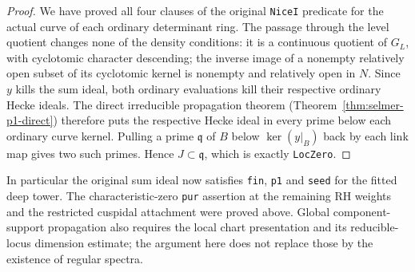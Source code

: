 \begin{proof}
We have proved all four clauses of the original
\texttt{NiceI} predicate for the actual curve of
each ordinary determinant ring. The passage
through the level quotient changes none of the
density conditions: it is a continuous quotient
of $G_L$, with cyclotomic character descending;
the inverse image of a nonempty relatively open
subset of its cyclotomic kernel is nonempty and
relatively open in $N$.
Since $y$ kills the sum ideal, both ordinary
evaluations kill their respective ordinary Hecke
ideals. The direct irreducible propagation theorem
(Theorem~\ref{thm:selmer-p1-direct}) therefore puts the respective Hecke
ideal in every prime below each ordinary curve
kernel. Pulling a prime $\mathfrak q$ of $B$
below $\ker(y|_B)$ back by each link map gives
two such primes. Hence $J\subset\mathfrak q$,
which is exactly \texttt{LocZero}.
\end{proof}

In particular the original sum ideal now satisfies
\texttt{fin}, \texttt{p1} and \texttt{seed} for
the fitted deep tower. The characteristic-zero
\texttt{pur} assertion at the remaining RH weights
and the restricted cuspidal attachment were proved
above. Global component-support propagation also
requires the local chart presentation and its
reducible-locus dimension estimate; the argument
here does not replace those by the existence of
regular spectra.
